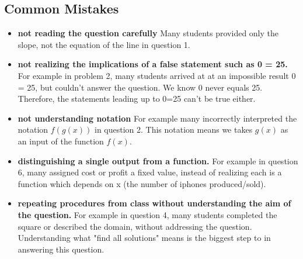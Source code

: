 \documentclass[a4paper, 12pt]{article}
\newcommand{\bt}[1]{\textbf{#1}} %
\begin{document}
\subsection*{Common Mistakes}

\begin{itemize}
    \item \bt{not reading the question carefully} Many students provided only the slope, not the equation of the line in question 1. 
    \item \bt{not realizing the implications of a false statement such as 0 = 25.} For example in problem 2, many students arrived at at an impossible result 0 = 25, but couldn't answer the question. We know 0 never equals 25. Therefore, the statements leading up to 0=25 can't be true either.
    \item \bt{not understanding notation} For example many incorrectly interpreted the notation $f(g(x))$ in question 2.
    This notation means we takes $g(x)$ as an input of the function $f(x)$.
    
    \item \bt{distinguishing a single output from a function.} For example in question 6, many assigned cost or profit a fixed value, instead of realizing each is a function which depends on x (the number of iphones produced/sold).

    \item \bt{repeating procedures from class without understanding the aim of the question.} For example in question 4, many students completed the square or described the domain, without addressing the question. Understanding what "find all solutions" means is the biggest step to in answering this question. 
\end{itemize}
\end{document}
